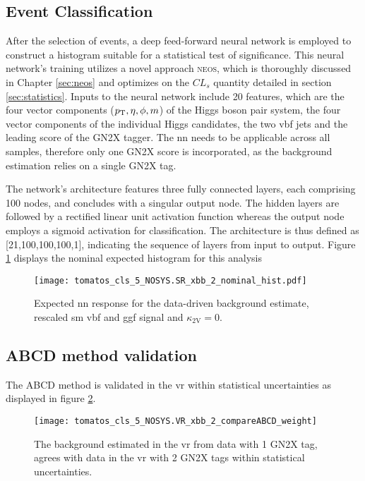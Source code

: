 \subsection{Event Classification}
After the selection of events, a deep feed-forward neural network is employed to construct a histogram suitable for a statistical test of significance. This neural network's training utilizes a novel approach \textsc{neos}, which is thoroughly discussed in Chapter \ref{sec:neos} and optimizes on the $CL_s$ quantity detailed in section \ref{sec:statistics}. Inputs to the neural network include 20 features, which are the four vector components ($p_{\text{T}},\eta,\phi,m$) of the Higgs boson pair system, the four vector components of the individual Higgs candidates, the two \ac{vbf} jets and the leading score of the GN2X tagger. The \ac{nn} needs to be applicable across all samples, therefore only one GN2X score is incorporated, as the background estimation relies on a single GN2X tag.

The network's architecture features three fully connected layers, each comprising 100 nodes, and concludes with a singular output node. The hidden layers are followed by a rectified linear unit activation function whereas the output node employs a sigmoid activation for classification. The architecture is thus defined as [21,100,100,100,1], indicating the sequence of layers from input to output. Figure \ref{fig:nominal-hist} displays the nominal expected histogram for this analysis

\begin{figure}
    \centering
    \texttt{[image: tomatos\_cls\_5\_NOSYS.SR\_xbb\_2\_nominal\_hist.pdf]}
    \caption[]{Expected \ac{nn} response for the data-driven background estimate, rescaled \ac{sm}  \ac{vbf} and \ac{ggf} signal and $\kappa_\text{2V}=0$.}
    \label{fig:nominal-hist}
\end{figure}

\subsection{ABCD method validation}
The ABCD method is validated in the \ac{vr} within statistical uncertainties as displayed in figure \ref{fig:bkg-validation}. 
\begin{figure}
    \centering
    \texttt{[image: tomatos\_cls\_5\_NOSYS.VR\_xbb\_2\_compareABCD\_weight]}
    \caption[]{The background estimated in the \ac{vr} from data with 1 GN2X tag, agrees with data in the \ac{vr} with 2 GN2X tags within statistical uncertainties.}
    \label{fig:bkg-validation}
\end{figure}


